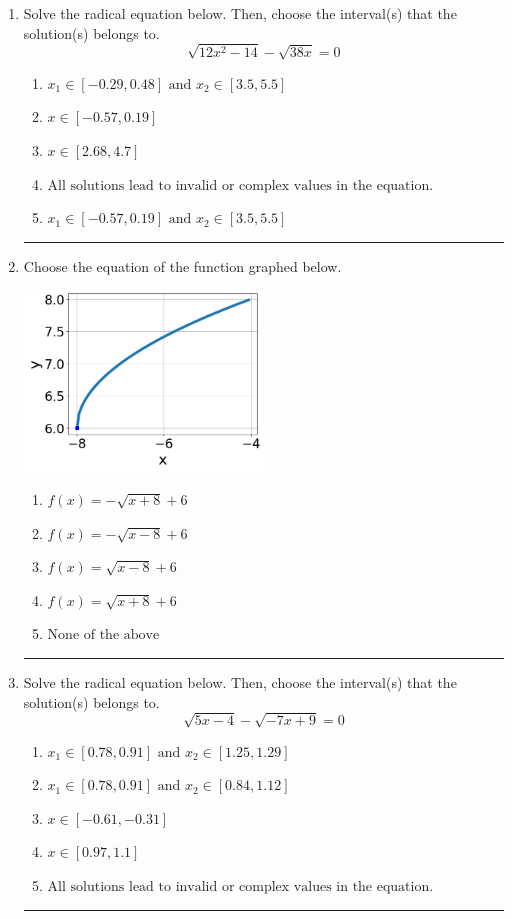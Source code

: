 \documentclass[14pt]{extbook}
\newcommand{\litem}[1]{\item#1\hspace*{-1cm}\rule{\textwidth}{0.4pt}}
\begin{document}
\begin{enumerate}
{\begin{enumerate}[label=\Alph*.]
\end{enumerate} }
\litem{
Solve the radical equation below. Then, choose the interval(s) that the solution(s) belongs to.\[ \sqrt{12 x^2 - 14} - \sqrt{38 x} = 0 \]\begin{enumerate}[label=\Alph*.]
\item \( x_1 \in [-0.29, 0.48] \text{ and } x_2 \in [3.5,5.5] \)
\item \( x \in [-0.57,0.19] \)
\item \( x \in [2.68,4.7] \)
\item \( \text{All solutions lead to invalid or complex values in the equation.} \)
\item \( x_1 \in [-0.57, 0.19] \text{ and } x_2 \in [3.5,5.5] \)

\end{enumerate} }
\litem{
Choose the equation of the function graphed below.
\begin{center}
    \includegraphics[width=0.5\textwidth]{../Figures/radicalGraphToEquationCopyC.png}
\end{center}
\begin{enumerate}[label=\Alph*.]
\item \( f(x) = - \sqrt{x + 8} + 6 \)
\item \( f(x) = - \sqrt{x - 8} + 6 \)
\item \( f(x) = \sqrt{x - 8} + 6 \)
\item \( f(x) = \sqrt{x + 8} + 6 \)
\item \( \text{None of the above} \)

\end{enumerate} }
\litem{
Solve the radical equation below. Then, choose the interval(s) that the solution(s) belongs to.\[ \sqrt{5 x - 4} - \sqrt{-7 x + 9} = 0 \]\begin{enumerate}[label=\Alph*.]
\item \( x_1 \in [0.78, 0.91] \text{ and } x_2 \in [1.25,1.29] \)
\item \( x_1 \in [0.78, 0.91] \text{ and } x_2 \in [0.84,1.12] \)
\item \( x \in [-0.61,-0.31] \)
\item \( x \in [0.97,1.1] \)
\item \( \text{All solutions lead to invalid or complex values in the equation.} \)


\end{enumerate}}
\end{enumerate}
\end{document}
